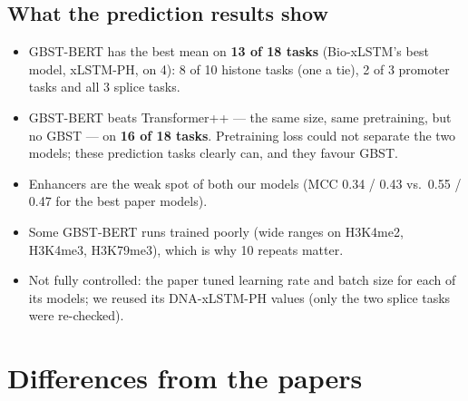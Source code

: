 \documentclass[11pt,a4paper]{article}
\begin{document}
\subsection*{What the prediction results show}
\begin{itemize}
\item GBST-BERT has the best mean on \textbf{13 of 18 tasks} (Bio-xLSTM's best model, xLSTM-PH,
  on 4): 8 of 10 histone tasks (one a tie), 2 of 3 promoter tasks and all 3 splice tasks.
\item GBST-BERT beats Transformer++ --- the same size, same pretraining, but no GBST --- on
  \textbf{16 of 18 tasks}. Pretraining loss could not separate the two models; these prediction
  tasks clearly can, and they favour GBST.
\item Enhancers are the weak spot of both our models (MCC 0.34 / 0.43 vs.\ 0.55 / 0.47 for the
  best paper models).
\item Some GBST-BERT runs trained poorly (wide ranges on H3K4me2, H3K4me3, H3K79me3), which is why
  10 repeats matter.
\item Not fully controlled: the paper tuned learning rate and batch size for each of its models; we
  reused its DNA-xLSTM-PH values (only the two splice tasks were re-checked).
\end{itemize}

\section{Differences from the papers}
\end{document}
